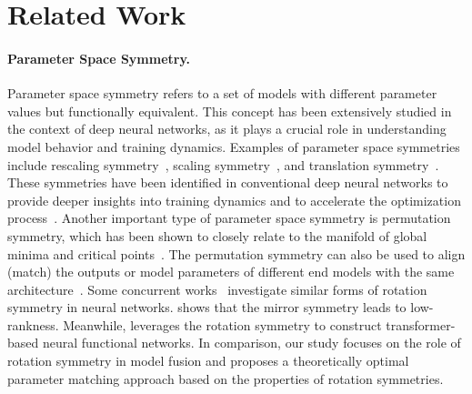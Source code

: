 \section{Related Work}
\paragraph{Parameter Space Symmetry.}
Parameter space symmetry refers to a set of models with different parameter values but functionally equivalent. This concept has been extensively studied in the context of deep neural networks, as it plays a crucial role in understanding model behavior and training dynamics. %
Examples of parameter space symmetries include rescaling symmetry~\citep{neyshabur2015path,badrinarayanan2015symmetry,du2018algorithmic,meng2019g}, scaling symmetry~\citep{kunin2021neural}, and translation symmetry~\citep{kunin2021neural}. These symmetries have been identified in conventional deep neural networks to provide deeper insights into training dynamics and to accelerate the optimization process~\citep{zhao2022symmetry,zhao2023symmetries,zhao2024improving}. Another important type of parameter space symmetry is permutation symmetry, which has been shown to closely relate to the manifold of global minima and critical points~\citep{fukumizu2000local,brea2019weight,simsek2021geometry,benton2021loss,entezari2022role,ainsworth2023git}. The permutation symmetry can also be used to align (match) the outputs or model parameters of different end models with the same architecture~\citep{singh2020model,wang2020federated,ainsworth2023git,imfeld2024transformer}.
Some concurrent works~\citep{ziyin2024symmetry,tran2024equivariant} investigate similar forms of rotation symmetry in neural networks.
\citet{ziyin2024symmetry} shows that the mirror symmetry leads to low-rankness. 
Meanwhile, \citet{tran2024equivariant} leverages the rotation symmetry to construct transformer-based neural functional networks.
In comparison, our study focuses on the role of rotation symmetry in model fusion and proposes a theoretically optimal parameter matching approach based on the properties of rotation symmetries.

